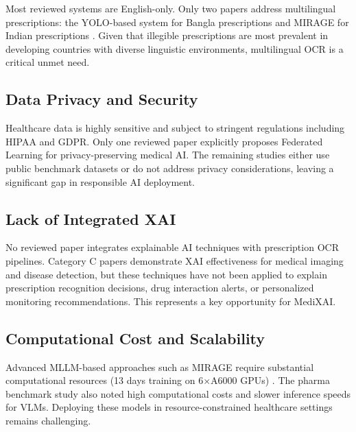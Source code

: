\documentclass[conference]{IEEEtran}
\begin{document}
Most reviewed systems are English-only. Only two papers address multilingual prescriptions: the YOLO-based system for Bangla prescriptions \cite{chandra2019prescription} and MIRAGE for Indian prescriptions \cite{mankash2024mirage}. Given that illegible prescriptions are most prevalent in developing countries with diverse linguistic environments, multilingual OCR is a critical unmet need.

\subsection{Data Privacy and Security}

Healthcare data is highly sensitive and subject to stringent regulations including HIPAA and GDPR. Only one reviewed paper \cite{babu2024aidriven} explicitly proposes Federated Learning for privacy-preserving medical AI. The remaining studies either use public benchmark datasets or do not address privacy considerations, leaving a significant gap in responsible AI deployment.

\subsection{Lack of Integrated XAI}

No reviewed paper integrates explainable AI techniques with prescription OCR pipelines. Category C papers demonstrate XAI effectiveness for medical imaging and disease detection, but these techniques have not been applied to explain prescription recognition decisions, drug interaction alerts, or personalized monitoring recommendations. This represents a key opportunity for MediXAI.

\subsection{Computational Cost and Scalability}

Advanced MLLM-based approaches such as MIRAGE require substantial computational resources (13 days training on 6$\times$A6000 GPUs) \cite{mankash2024mirage}. The pharma benchmark study \cite{intuitionlabs2026pharma} also noted high computational costs and slower inference speeds for VLMs. Deploying these models in resource-constrained healthcare settings remains challenging.
\end{document}

